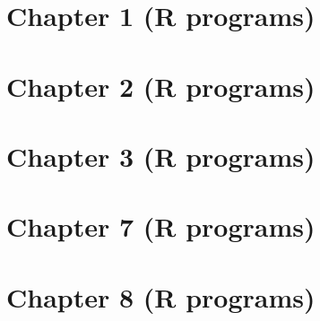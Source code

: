 \documentclass[11pt,a4paper]{article}
\begin{document}
\section*{Chapter 1 (R programs)}







\clearpage
\section*{Chapter 2 (R programs)}








\clearpage
\section*{Chapter 3 (R programs)}





%







\clearpage
















\clearpage
\section*{Chapter 7 (R programs)}







\clearpage
\section*{Chapter 8 (R programs)}







\end{document}
